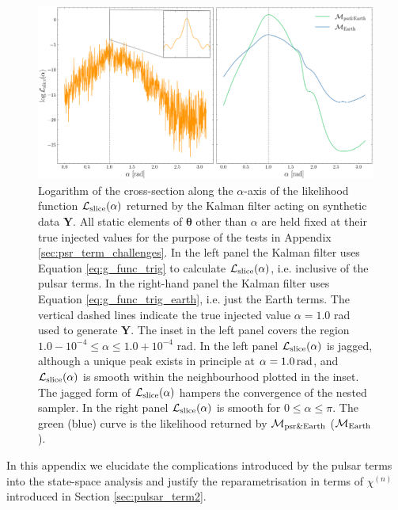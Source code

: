 \documentclass[fleqn,usenatbib,useAMS]{mnras}
\begin{document}
\begin{figure}
	\includegraphics[width=\textwidth, height =0.5\textwidth ]{images/Likelihoods_alpha_v3}
	\caption{Logarithm of the cross-section along the $\alpha$-axis of the likelihood function $\mathcal{L}_{\rm slice}(\alpha)$ returned by the Kalman filter acting on synthetic data $\boldsymbol{Y}$. All static elements of $\boldsymbol{\theta}$ other than $\alpha$ are held fixed at their true injected values for the purpose of the tests in Appendix \ref{sec:psr_term_challenges}. In the left panel the Kalman filter uses Equation \eqref{eq:g_func_trig} to calculate $\mathcal{L}_{\rm slice}(\alpha)$, i.e. inclusive of the pulsar terms. In the right-hand panel the Kalman filter uses Equation \eqref{eq:g_func_trig_earth}, i.e. just the Earth terms. The vertical dashed lines indicate the true injected value $\alpha = 1.0$ rad used to generate $\boldsymbol{Y}$. The inset in the left panel covers the region $1.0 - 10^{-4} \le \alpha \le 1.0 +10^{-4}$ rad. In the left panel $\mathcal{L}_{\rm slice}(\alpha)$ is jagged, although a unique peak exists in principle at $\alpha=1.0 \, {\rm rad}$, and $\mathcal{L}_{\rm slice}(\alpha)$ is smooth within the neighbourhood plotted in the inset. The jagged form of $\mathcal{L}_{\rm slice}(\alpha)$ hampers the convergence of the nested sampler. In the right panel $\mathcal{L}_{\rm slice}(\alpha)$ is smooth for $0\leq\alpha\leq \pi$. The green (blue) curve is the likelihood returned by $\mathcal{M}_{\rm psr\&Earth}$ ($\mathcal{M}_{\rm Earth}$).}
	\label{fig:likelihood_comparison}
\end{figure}
In this appendix we elucidate the complications introduced by the pulsar terms into the state-space analysis and justify the reparametrisation in terms of $\chi^{(n)}$ introduced in Section \ref{sec:pulsar_term2}. \newline 
\end{document}
